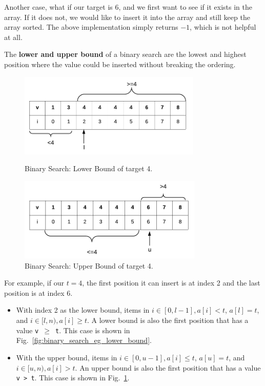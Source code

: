 \documentclass[main.tex]{subfiles}
\begin{document}
Another case, what if our target is 6, and we first want to see if it exists in the array. If it does not, we would like to insert it into the array and still keep the array sorted. The above implementation simply returns $-1$, which is not helpful at all. 

The \textbf{lower and upper bound} of a binary search are the lowest and highest position where the value could be inserted without breaking the ordering. 

\begin{figure}[H]
    \centering
    \includegraphics[width=0.9\columnwidth, height=4cm]{fig/binary_search_lower_bound.png}
        \caption{Binary Search: Lower  Bound of target 4.}
            \label{fig:binary_search_eg_lower_bound}
    \includegraphics[width=0.9\columnwidth, height=4cm]{fig/binary_search_upper_bound.png}
    \caption{Binary Search: Upper Bound of target 4.}
    \label{fig:binary_search_eg_upper_bound}
\end{figure} 
For example, if our $t=4$, the first position it can insert is at index 2 and the last position is at index 6.
\begin{itemize}
    \item 
With index 2 as the lower bound, 
items in $i \in [0, l-1], a[i]<t$, $a[l] = t$, and $i\in[l, n), a[i] \geq t$. A lower bound is also the first position that has a value \texttt{v $\geq$ t}.  This case is shown in Fig.~\ref{fig:binary_search_eg_lower_bound}.
\item With the upper bound, items in $i \in [0, u-1], a[i]\leq t$, $a[u] = t$, and $i\in[u, n), a[i] > t$. An upper bound is also the first position that has a value \texttt{v > t}.  This case is shown in Fig.~\ref{fig:binary_search_eg_upper_bound}.
\end{itemize}
\end{document}
